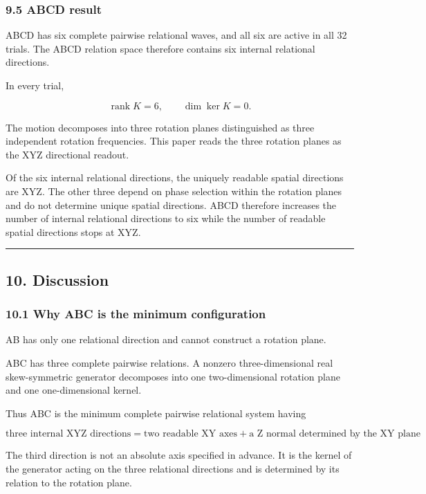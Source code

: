 \documentclass[
  10pt,
  a4paper,
]{article}
\begin{document}
\subsubsection{9.5 ABCD result}\label{abcd-result}

ABCD has six complete pairwise relational waves, and all six are active
in all 32 trials. The ABCD relation space therefore contains six
internal relational directions.

In every trial,

\[
\operatorname{rank}K=6,
\qquad
\dim\ker K=0.
\]

The motion decomposes into three rotation planes distinguished as three
independent rotation frequencies. This paper reads the three rotation
planes as the XYZ directional readout.

Of the six internal relational directions, the uniquely readable spatial
directions are XYZ. The other three depend on phase selection within the
rotation planes and do not determine unique spatial directions. ABCD
therefore increases the number of internal relational directions to six
while the number of readable spatial directions stops at XYZ.

\begin{center}\rule{0.5\linewidth}{0.5pt}\end{center}

\subsection{10. Discussion}\label{discussion}

\subsubsection{10.1 Why ABC is the minimum
configuration}\label{why-abc-is-the-minimum-configuration}

AB has only one relational direction and cannot construct a rotation
plane.

ABC has three complete pairwise relations. A nonzero three-dimensional
real skew-symmetric generator decomposes into one two-dimensional
rotation plane and one one-dimensional kernel.

Thus ABC is the minimum complete pairwise relational system having

\[
\boxed{
\text{three internal XYZ directions}
=
\text{two readable XY axes}
+
\text{a Z normal determined by the XY plane}
}.
\]

The third direction is not an absolute axis specified in advance. It is
the kernel of the generator acting on the three relational directions
and is determined by its relation to the rotation plane.
\end{document}
